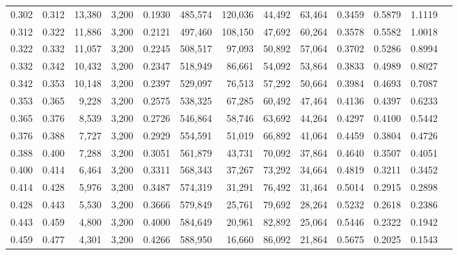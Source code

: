 \begin{tabular}{rrrrrrrrrrrrr}
0.302 & 0.312 &  13,380 & 3,200 &                                     0.1930 & 485,574 & 120,036 &  44,492 &  63,464 & 0.3459 & 0.5879 & 1.1119 \\
0.312 & 0.322 &  11,886 & 3,200 &                                     0.2121 & 497,460 & 108,150 &  47,692 &  60,264 & 0.3578 & 0.5582 & 1.0018 \\
0.322 & 0.332 &  11,057 & 3,200 &                                     0.2245 & 508,517 &  97,093 &  50,892 &  57,064 & 0.3702 & 0.5286 & 0.8994 \\
0.332 & 0.342 &  10,432 & 3,200 &                                     0.2347 & 518,949 &  86,661 &  54,092 &  53,864 & 0.3833 & 0.4989 & 0.8027 \\
0.342 & 0.353 &  10,148 & 3,200 &                                     0.2397 & 529,097 &  76,513 &  57,292 &  50,664 & 0.3984 & 0.4693 & 0.7087 \\
0.353 & 0.365 &   9,228 & 3,200 &                                     0.2575 & 538,325 &  67,285 &  60,492 &  47,464 & 0.4136 & 0.4397 & 0.6233 \\
0.365 & 0.376 &   8,539 & 3,200 &                                     0.2726 & 546,864 &  58,746 &  63,692 &  44,264 & 0.4297 & 0.4100 & 0.5442 \\
0.376 & 0.388 &   7,727 & 3,200 &                                     0.2929 & 554,591 &  51,019 &  66,892 &  41,064 & 0.4459 & 0.3804 & 0.4726 \\
0.388 & 0.400 &   7,288 & 3,200 &                                     0.3051 & 561,879 &  43,731 &  70,092 &  37,864 & 0.4640 & 0.3507 & 0.4051 \\
0.400 & 0.414 &   6,464 & 3,200 &                                     0.3311 & 568,343 &  37,267 &  73,292 &  34,664 & 0.4819 & 0.3211 & 0.3452 \\
0.414 & 0.428 &   5,976 & 3,200 &                                     0.3487 & 574,319 &  31,291 &  76,492 &  31,464 & 0.5014 & 0.2915 & 0.2898 \\
0.428 & 0.443 &   5,530 & 3,200 &                                     0.3666 & 579,849 &  25,761 &  79,692 &  28,264 & 0.5232 & 0.2618 & 0.2386 \\
0.443 & 0.459 &   4,800 & 3,200 &                                     0.4000 & 584,649 &  20,961 &  82,892 &  25,064 & 0.5446 & 0.2322 & 0.1942 \\
0.459 & 0.477 &   4,301 & 3,200 &                                     0.4266 & 588,950 &  16,660 &  86,092 &  21,864 & 0.5675 & 0.2025 & 0.1543 \\

\end{tabular}
